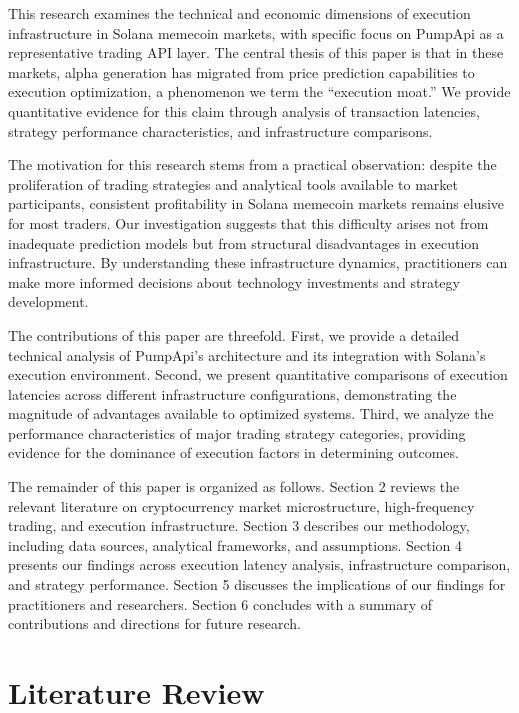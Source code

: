 \documentclass[12pt,a4paper]{article}
\begin{document}
This research examines the technical and economic dimensions of execution infrastructure in Solana memecoin markets, with specific focus on PumpApi as a representative trading API layer. The central thesis of this paper is that in these markets, alpha generation has migrated from price prediction capabilities to execution optimization, a phenomenon we term the ``execution moat.'' We provide quantitative evidence for this claim through analysis of transaction latencies, strategy performance characteristics, and infrastructure comparisons.

The motivation for this research stems from a practical observation: despite the proliferation of trading strategies and analytical tools available to market participants, consistent profitability in Solana memecoin markets remains elusive for most traders. Our investigation suggests that this difficulty arises not from inadequate prediction models but from structural disadvantages in execution infrastructure. By understanding these infrastructure dynamics, practitioners can make more informed decisions about technology investments and strategy development.

The contributions of this paper are threefold. First, we provide a detailed technical analysis of PumpApi's architecture and its integration with Solana's execution environment. Second, we present quantitative comparisons of execution latencies across different infrastructure configurations, demonstrating the magnitude of advantages available to optimized systems. Third, we analyze the performance characteristics of major trading strategy categories, providing evidence for the dominance of execution factors in determining outcomes.

The remainder of this paper is organized as follows. Section 2 reviews the relevant literature on cryptocurrency market microstructure, high-frequency trading, and execution infrastructure. Section 3 describes our methodology, including data sources, analytical frameworks, and assumptions. Section 4 presents our findings across execution latency analysis, infrastructure comparison, and strategy performance. Section 5 discusses the implications of our findings for practitioners and researchers. Section 6 concludes with a summary of contributions and directions for future research.

\section{Literature Review}
\end{document}
